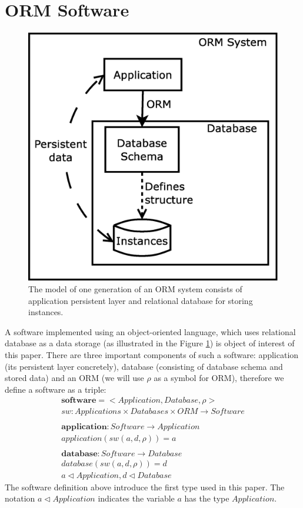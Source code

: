 \documentclass[11pt]{article}
\begin{document}
\section{ORM Software}
\label{sec:evoIntro}
\begin{figure}
\centering
	\includegraphics[scale=0.3]{./images/system}
	\caption{The model of one generation of an ORM system consists of application persistent layer and relational database for storing instances.}
\label{fig:appStructure}
\end{figure}
A software implemented using an object-oriented language, which uses relational database as a data storage (as illustrated in the Figure \ref{fig:appStructure}) is object of interest of this paper. There are three important components of such a software: application (its persistent layer concretely), database (consisting of database schema and stored data) and an ORM (we will use $\rho$ as a symbol for ORM), therefore we define a software as a triple:
\begin{align*}
	\mathbf{software} = < Application, Database, \rho > \\
	sw : Applications \times Databases \times ORM \rightarrow Software \\ \\
	\mathbf{application} : Software \rightarrow Application \\
	application(sw(a, d, \rho)) = a \\ \\
	\mathbf{database} : Software \rightarrow Database \\
	database(sw(a, d, \rho)) = d \\
	a \lhd Application, d \lhd Database
\end{align*}
The software definition above introduce the first type used in this paper. The notation $a \lhd Application$ indicates the variable $a$ has the type $Application$.
\end{document}
